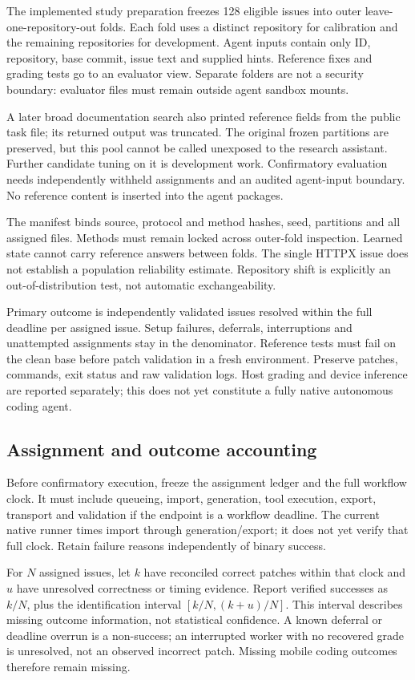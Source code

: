 \documentclass[10pt,twocolumn]{article}
\begin{document}
The implemented study preparation freezes 128 eligible issues into outer
leave-one-repository-out folds. Each fold uses a distinct repository for
calibration and the remaining repositories for development. Agent inputs contain
only ID, repository, base commit, issue text and supplied hints. Reference fixes
and grading tests go to an evaluator view. Separate folders are not a security
boundary: evaluator files must remain outside agent sandbox mounts.

A later broad documentation search also printed reference fields from the
public task file; its returned output was truncated. The original frozen
partitions are preserved, but this pool cannot be called unexposed to the
research assistant. Further candidate tuning on it is development work.
Confirmatory evaluation needs independently withheld assignments and an audited
agent-input boundary. No reference content is inserted into the agent packages.

The manifest binds source, protocol and method hashes, seed, partitions and all
assigned files. Methods must remain locked across outer-fold inspection. Learned
state cannot carry reference answers between folds. The single HTTPX issue does
not establish a population reliability estimate. Repository shift is explicitly
an out-of-distribution test, not automatic exchangeability.

Primary outcome is independently validated issues resolved within the full
deadline per assigned issue. Setup failures, deferrals, interruptions and
unattempted assignments stay in the denominator. Reference tests must fail on
the clean base before patch validation in a fresh environment. Preserve patches,
commands, exit status and raw validation logs. Host grading and device inference
are reported separately; this does not yet constitute a fully native autonomous
coding agent.

\subsection{Assignment and outcome accounting}
Before confirmatory execution, freeze the assignment ledger and the full
workflow clock. It must include queueing, import, generation, tool execution,
export, transport and validation if the endpoint is a workflow deadline. The
current native runner times import through generation/export; it does not yet
verify that full clock. Retain failure reasons independently of binary success.

For $N$ assigned issues, let $k$ have reconciled correct patches within that
clock and $u$ have unresolved correctness or timing evidence. Report verified
successes as $k/N$, plus the identification interval
$[k/N,(k+u)/N]$. This interval describes missing outcome information, not
statistical confidence. A known deferral or deadline overrun is a non-success;
an interrupted worker with no recovered grade is unresolved, not an observed
incorrect patch. Missing mobile coding outcomes therefore remain missing.
\end{document}

